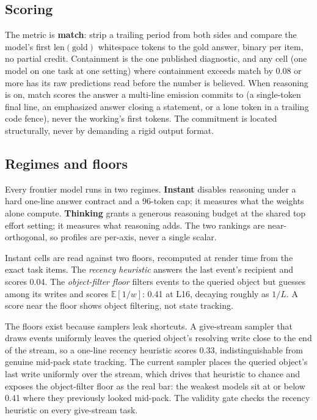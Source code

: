 \documentclass[11pt]{article}
\begin{document}
\subsection{Scoring}

The metric is \textbf{match}: strip a trailing period from both sides and compare the model's
first $\mathrm{len}(\mathrm{gold})$ whitespace tokens to the gold answer, binary per item, no
partial credit. Containment is the one published diagnostic, and any cell (one model on one task at one setting) where containment
exceeds match by 0.08 or more has its raw predictions read before the number is believed. When reasoning is on, match scores the answer a multi-line emission commits to (a single-token final
line, an emphasized answer closing a statement, or a lone token in a trailing code fence),
never the working's first tokens. The commitment is located structurally, never by demanding a
rigid output format.

\subsection{Regimes and floors}

Every frontier model runs in two regimes. \textbf{Instant} disables reasoning under a hard one-line answer contract and a 96-token cap; it measures what the weights alone compute. \textbf{Thinking} grants a generous reasoning budget at the shared top effort setting; it measures what reasoning adds. The two rankings are near-orthogonal, so profiles are per-axis, never a single scalar.

Instant cells are read against two floors, recomputed at render time from the exact task
items. The \emph{recency heuristic} answers the last event's recipient and scores 0.04. The
\emph{object-filter floor} filters events to the queried object but guesses among its writes
and scores $\mathbb{E}[1/w]$: 0.41 at L16, decaying roughly as $1/L$. A score near the floor
shows object filtering, not state tracking.

The floors exist because samplers leak shortcuts. A give-stream sampler that draws events
uniformly leaves the queried object's resolving write close to the end of the stream, so a one-line recency heuristic scores 0.33, indistinguishable from genuine mid-pack state tracking. The
current sampler places the queried object's last write uniformly over the stream, which drives
that heuristic to chance and exposes the object-filter floor as the real bar: the weakest models sit at or below 0.41 where they previously looked mid-pack. The validity gate checks
the recency heuristic on every give-stream task.
\end{document}
